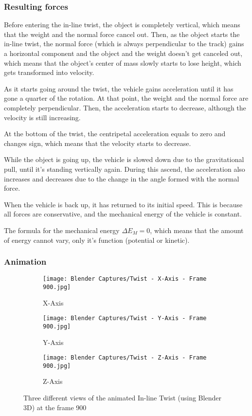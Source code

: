 \documentclass[12pt,twoside,a4paper]{article}
\begin{document}
	\subsubsection{Resulting forces}
	Before entering the in-line twist, the object is completely vertical, which means that the weight and the normal force cancel out. Then, as the object starts the in-line twist, the normal force (which is always perpendicular to the track) gains a horizontal component and the object and the weight doesn't get canceled out, which means that the object's center of mass slowly starts to lose height, which gets transformed into velocity.
	
	As it starts going around the twist, the vehicle gains acceleration until it has gone a quarter of the rotation. At that point, the weight and the normal force are completely perpendicular. Then, the acceleration starts to decrease, although the velocity is still increasing.
	
	At the bottom of the twist, the centripetal acceleration equals to zero and changes sign, which means that the velocity starts to decrease.
	
	While the object is going up, the vehicle is slowed down due to the gravitational pull, until it's standing vertically again. During this ascend, the acceleration also increases and decreases due to the change in the angle formed with the normal force.
	
	When the vehicle is back up, it has returned to its initial speed. This is because all forces are conservative, and the mechanical energy of the vehicle is constant.
	
	The formula for the mechanical energy $\Delta E_M = 0$, which means that the amount of energy cannot vary, only it's function (potential or kinetic).
	
	\subsubsection{Animation}
	
	\begin{figure}[H]
		\centering
		\begin{subfigure}{.3\textwidth}
			\centering
			\texttt{[image: Blender Captures/Twist - X-Axis - Frame 900.jpg]}
			\caption{X-Axis}
			\label{fig:sub4}
		\end{subfigure}%
		\begin{subfigure}{.3\textwidth}
			\centering
			\texttt{[image: Blender Captures/Twist - Y-Axis - Frame 900.jpg]}
			\caption{Y-Axis}
			\label{fig:sub5}
		\end{subfigure}%
		\begin{subfigure}{.3\textwidth}
			\centering
			\texttt{[image: Blender Captures/Twist - Z-Axis - Frame 900.jpg]}
			\caption{Z-Axis}
			\label{fig:sub6}
		\end{subfigure}%
		\caption{Three different views of the animated In-line Twist (using Blender 3D) at the frame 900}
		\label{fig:Blender - Twist - Lateral}
	\end{figure}
	
\end{document}
